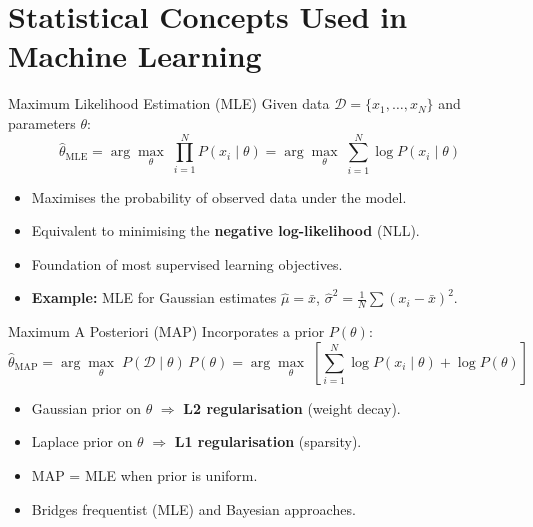\section{Statistical Concepts Used in Machine Learning}

\begin{frame}{Maximum Likelihood Estimation (MLE)}
Given data $\mathcal{D} = \{x_1, \dots, x_N\}$ and parameters $\theta$:
\[
\hat{\theta}_{\text{MLE}} = \arg\max_{\theta}\; \prod_{i=1}^{N} P(x_i \mid \theta)
= \arg\max_{\theta}\; \sum_{i=1}^{N} \log P(x_i \mid \theta)
\]
\begin{itemize}
    \item Maximises the probability of observed data under the model.
    \item Equivalent to minimising the \textbf{negative log-likelihood} (NLL).
    \item Foundation of most supervised learning objectives.
    \item \textbf{Example:} MLE for Gaussian estimates $\hat{\mu} = \bar{x}$, $\hat{\sigma}^2 = \frac{1}{N}\sum(x_i - \bar{x})^2$.
\end{itemize}
\end{frame}

\begin{frame}{Maximum A Posteriori (MAP)}
Incorporates a prior $P(\theta)$:
\[
\hat{\theta}_{\text{MAP}} = \arg\max_{\theta}\; P(\mathcal{D} \mid \theta)\, P(\theta)
= \arg\max_{\theta}\; \left[\sum_{i=1}^{N} \log P(x_i \mid \theta) + \log P(\theta)\right]
\]
\begin{itemize}
    \item Gaussian prior on $\theta$ $\Rightarrow$ \textbf{L2 regularisation} (weight decay).
    \item Laplace prior on $\theta$ $\Rightarrow$ \textbf{L1 regularisation} (sparsity).
    \item MAP = MLE when prior is uniform.
    \item Bridges frequentist (MLE) and Bayesian approaches.
\end{itemize}
\end{frame}

